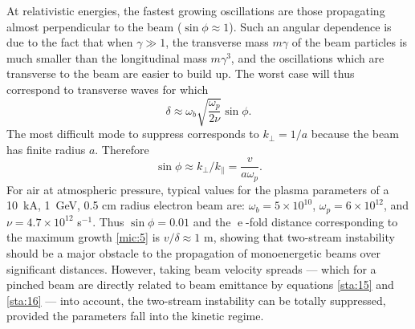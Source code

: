 \documentclass [12pt,a4paper,     ]{report} %
\newcommand{\e  }{\operatorname{e}}   %
\begin{document}
   At relativistic energies, the fastest growing oscillations are those propagating almost perpendicular to the beam ($\sin\phi \approx 1$).  Such an angular dependence is due to the fact that when $\gamma \gg 1$, the transverse mass $m\gamma$ of the beam particles is much smaller than the longitudinal mass $m\gamma^3$, and the oscillations which are transverse to the beam are easier to build up.  The worst case will thus correspond to transverse waves for which
%
\begin{equation}\label{mic:5} %
   \delta \approx \omega_b \sqrt{ \frac{\omega_p}{2\nu} } \sin\phi.
\end{equation}
%
The most difficult mode to suppress corresponds to $k_{\perp} = 1/a$ because the beam has finite radius $a$.  Therefore
%
\begin{equation}\label{mic:6} %
       \sin\phi \approx k_{\perp}/k_{\|} = \frac{v}{a\omega_p}.
\end{equation}
%
For air at atmospheric pressure, typical values for the plasma parameters of a 10~kA, 1~GeV, 0.5 cm radius electron beam are: $\omega_b = 5 \times 10^{10}$,  $\omega_p  = 6 \times 10^{12}$, and $\nu = 4.7 \times 10^{12}$ s$^{-1}$.  Thus $\sin\phi = 0.01$ and the $\e$-fold distance corresponding to the maximum growth \eqref{mic:5} is $v/\delta \approx 1$ m, showing that two-stream instability should be a major obstacle to the propagation of monoenergetic beams over significant distances.  However, taking beam velocity spreads --- which for a pinched beam are directly related to beam emittance by equations \eqref{sta:15} and \eqref{sta:16} --- into account, the two-stream instability can be totally suppressed, provided the parameters fall into the kinetic regime.
\end{document}
